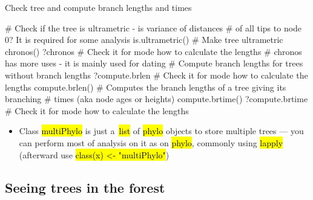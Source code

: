 \documentclass[compress, ucs, xelatex, 11pt, xcolor=svgnames,
	hyperref={
		bookmarks=true,
		unicode=true,
		colorlinks=true,
		pdftitle={Molecular data in R},
		plainpages=false,
		pdfauthor={Vojtech Zeisek},
		pdfsubject={Course about phylogeny and evolution in R},
		pdfcreator={XeLaTeX},
		pdfkeywords={R, evolution, phylogeny, molecular data},
		linkcolor=Tomato,
		anchorcolor=SaddleBrown,
		citecolor=Goldenrod,
		filecolor=DarkMagenta,
		menucolor=Sienna,
		urlcolor=DarkTurquoise,
		pdftex},
	url={hyphens, lowtilde} %
	]{beamer}
\renewcommand{\texttt}[1]{\hl{\ttfamily #1}}
\begin{document}
\begin{frame}[fragile]{Check tree and compute branch lengths and times}
	\begin{spluscode}
    # Check if the tree is ultrametric - is variance of distances
    # of all tips to node 0? It is required for some analysis
    is.ultrametric()
    # Make tree ultrametric
    chronos()
    ?chronos # Check it for mode how to calculate the lengths
    # chronos has more uses - it is mainly used for dating
    # Compute branch lengths for trees without branch lengths
    ?compute.brlen # Check it for mode how to calculate the lengths
    compute.brlen()
    # Computes the branch lengths of a tree giving its branching
    # times (aka node ages or heights)
    compute.brtime()
    ?compute.brtime # Check it for mode how to calculate the lengths
	\end{spluscode}
	\begin{itemize}
		\item Class \texttt{multiPhylo} is just a~\texttt{list} of \texttt{phylo} objects to store multiple trees --- you can perform most of analysis on it as on \texttt{phylo}, commonly using \texttt{lapply} (afterward use \texttt{class(x) <- "multiPhylo"})
	\end{itemize}
\end{frame}

\subsection{Seeing trees in the forest}
\end{document}
